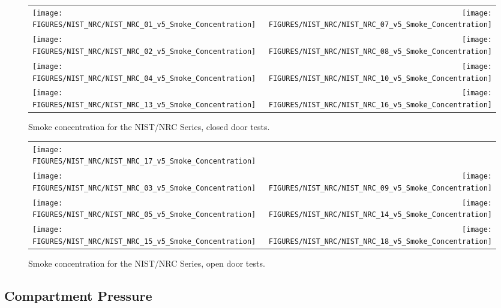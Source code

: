 \begin{figure}[p]
\begin{tabular*}{\textwidth}{l@{\extracolsep{\fill}}r}
\texttt{[image: FIGURES/NIST\_NRC/NIST\_NRC\_01\_v5\_Smoke\_Concentration]} &
\texttt{[image: FIGURES/NIST\_NRC/NIST\_NRC\_07\_v5\_Smoke\_Concentration]} \\
\texttt{[image: FIGURES/NIST\_NRC/NIST\_NRC\_02\_v5\_Smoke\_Concentration]} &
\texttt{[image: FIGURES/NIST\_NRC/NIST\_NRC\_08\_v5\_Smoke\_Concentration]} \\
\texttt{[image: FIGURES/NIST\_NRC/NIST\_NRC\_04\_v5\_Smoke\_Concentration]} &
\texttt{[image: FIGURES/NIST\_NRC/NIST\_NRC\_10\_v5\_Smoke\_Concentration]} \\
\texttt{[image: FIGURES/NIST\_NRC/NIST\_NRC\_13\_v5\_Smoke\_Concentration]} &
\texttt{[image: FIGURES/NIST\_NRC/NIST\_NRC\_16\_v5\_Smoke\_Concentration]}
\end{tabular*}
\caption{Smoke concentration for the NIST/NRC Series, closed door tests.}
\label{NIST_NRC_Smoke_Closed}
\end{figure}

\begin{figure}[p]
\begin{tabular*}{\textwidth}{l@{\extracolsep{\fill}}r}
\texttt{[image: FIGURES/NIST\_NRC/NIST\_NRC\_17\_v5\_Smoke\_Concentration]} &
 \\
\texttt{[image: FIGURES/NIST\_NRC/NIST\_NRC\_03\_v5\_Smoke\_Concentration]} &
\texttt{[image: FIGURES/NIST\_NRC/NIST\_NRC\_09\_v5\_Smoke\_Concentration]} \\
\texttt{[image: FIGURES/NIST\_NRC/NIST\_NRC\_05\_v5\_Smoke\_Concentration]} &
\texttt{[image: FIGURES/NIST\_NRC/NIST\_NRC\_14\_v5\_Smoke\_Concentration]} \\
\texttt{[image: FIGURES/NIST\_NRC/NIST\_NRC\_15\_v5\_Smoke\_Concentration]} &
\texttt{[image: FIGURES/NIST\_NRC/NIST\_NRC\_18\_v5\_Smoke\_Concentration]}
\end{tabular*}
\caption{Smoke concentration for the NIST/NRC Series, open door tests.}
\label{NIST_NRC_Smoke_Open}
\end{figure}

\clearpage

\subsection{Compartment Pressure}

